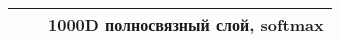 \begin{table}[H]
{\begin{tabular}{|c|c|c|l|l|l|}
                                                                                        &                 & \multicolumn{4}{c|}{1000D полносвязный слой, softmax}                                                                                                                                                                                                                                                                                                                                                                                               \\ \hline
    \end{tabular}
    }
\end{table}

